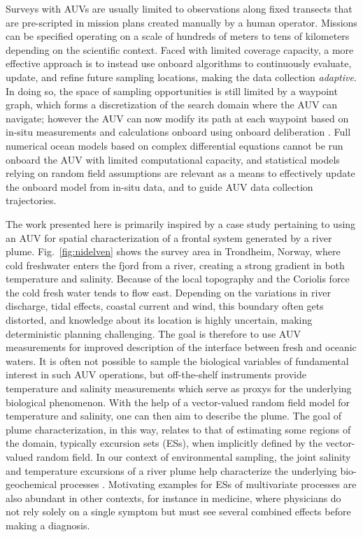 \documentclass[aoas]{imsart}
\begin{document}
Surveys with AUVs are usually limited to observations along fixed
transects that are pre-scripted in mission plans created manually by a
human operator. Missions can be specified operating on a scale of
hundreds of meters to tens of kilometers depending on the scientific
context. Faced with limited coverage capacity, a more effective
approach is to instead use onboard algorithms to continuously
evaluate, update, and refine future sampling locations, making the
data collection \emph{adaptive}.  In doing so, the space of sampling
opportunities is still limited by a waypoint graph, which forms a
discretization of the search domain where the AUV can navigate;
however the AUV can now modify its path at each waypoint based on
in-situ measurements and calculations onboard using onboard
deliberation \citep{py10,Rajan12,Rajan12b}.  Full numerical ocean
models based on complex differential equations cannot be run onboard
the AUV with limited computational capacity, and statistical models
relying on random field assumptions are relevant as a means to
effectively update the onboard model from in-situ data, and to guide
AUV data collection trajectories.

The work presented here is primarily inspired by a case study
pertaining to using an AUV for spatial characterization of a frontal
system generated by a river plume. Fig.~\ref{fig:nidelven} shows the
survey area in Trondheim, Norway, where cold freshwater enters the fjord from a river, creating a strong gradient in both temperature and
salinity. Because of the local topography and the Coriolis force the
cold fresh water tends to flow east. Depending on the variations in
river discharge, tidal effects, coastal current and wind, this
boundary often gets distorted, and knowledge about its location is
highly uncertain, making deterministic planning challenging. The goal
is therefore to use AUV measurements for improved description of the
interface between fresh and oceanic waters.  It is often not possible
to sample the biological variables of fundamental interest in such AUV
operations, but off-the-shelf instruments provide temperature and
salinity measurements which serve as proxys for the underlying
biological phenomenon. With the help of a vector-valued random field
model for temperature and salinity, one can then aim to describe the
plume.  The goal of plume characterization, in this way, relates to
that of estimating some regions of the domain, typically excursion
sets (ESs), when implicitly defined by the vector-valued random field.
In our context of environmental sampling, the joint salinity and
temperature excursions of a river plume help characterize the
underlying bio-geochemical processes
\citep{hopkins2013detection,Pinto2018}. Motivating examples for ESs of
multivariate processes are also abundant in other contexts, for
instance in medicine, where physicians do not rely solely on a single
symptom but must see several combined effects before making a
diagnosis.
\end{document}
